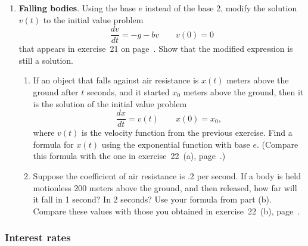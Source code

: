 \begin{enumerate}
\begin{enumerate}
  \item The per capita food supply in any year equals the ratio
$F(t)/P(t)$.  What happens to this ratio as $t$ grows larger and
larger?  (Use your graphs in (c) to assist your explanation.)  Do your
results support Malthus's prediction?  Explain.



\end{enumerate}
\item {\bf Falling bodies}. Using the base $e$
instead of the base 2, modify the solution $v(t)$ to the initial value
problem
\[
\dfrac{dv}{dt} = -g - bv \qquad v(0) = 0
\]
that appears in exercise~21 on page~\pageref{ex:falling body1}.  Show
that the modified expression is still a solution.

  \begin{enumerate}
  \item If an object that falls against air resistance is $x(t)$ meters
above the ground after $t$ seconds, and it started $x_0$ meters above
the ground, then it is the solution of the initial value problem
\[
\dfrac{dx}{dt} = v(t) \qquad x(0) = x_0,
\]
where $v(t)$ is the velocity function from the previous exercise.
Find a formula for $x(t)$ using the exponential function with base
$e$.  (Compare this formula with the one in exercise~22~(a),
page~\pageref{ex:falling body2}.)


  \item Suppose the coefficient of air resistance is .2 per second.  If a
body is held motionless 200 meters above the ground, and then
released, how far will it fall in 1 second?  In 2 seconds?  Use your
formula from part (b).  Compare these values with those you obtained
in exercise~22~(b), page~\pageref{ex:falling body3}.

\end{enumerate}
\end{enumerate}
\subsubsection{Interest rates} 
\label{subsubsec:interest-rates}


